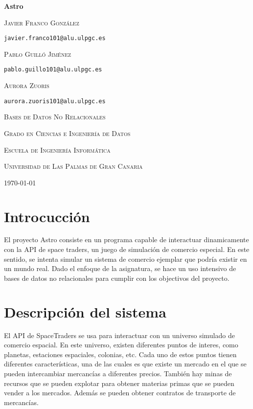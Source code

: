 \documentclass[spanish]{article}
\begin{document}
\begin{titlepage}
	\centering
	{\huge\bfseries Astro \par}
	\vspace{2cm}
	{\scshape\Large Javier Franco González \par\tt{javier.franco101@alu.ulpgc.es}\par}
	\vspace{1cm}
	{\scshape\Large Pablo Guilló Jiménez \par\tt{pablo.guillo101@alu.ulpgc.es}\par}
	\vspace{1cm}
	{\scshape\Large Aurora Zuoris \par\tt{aurora.zuoris101@alu.ulpgc.es}\par}
	\vspace{3cm}
	{\scshape\large Bases de Datos No Relacionales \par}
	\vspace{1cm}
	{\scshape\large Grado en Ciencias e Ingeniería de Datos\par}
	\vspace{1cm}
	{\scshape\large Escuela de Ingeniería Informática\par}
	\vspace{1cm}
	{\scshape\large Universidad de Las Palmas de Gran Canaria\par}
	\vspace{1cm}
	{\scshape\large \today{} \par}
\end{titlepage}

\tableofcontents

\section{Introcucción}

El proyecto Astro consiste en un programa capable de interactuar dinamicamente con la API de space traders,
un juego de simulación de comercio especial. En este sentido, se intenta simular un sistema de comercio
ejemplar que podría existir en un mundo real.
Dado el enfoque de la asignatura, se hace un uso intensivo de bases de datos no relacionales para
cumplir con los objectivos del proyecto.

\section{Descripción del sistema}

El API de SpaceTraders se usa para interactuar con
un universo simulado de comercio espacial.
En este universo, existen diferentes puntos de interes,
como planetas, estaciones espaciales, colonias, etc.
Cada uno de estos puntos tienen diferentes características,
una de las cuales es que existe un mercado en el que se pueden
intercambiar mercancías a diferentes precios.
También hay minas de recursos que se pueden explotar para
obtener materias primas que se pueden vender a los mercados.
Además se pueden obtener contratos de transporte de mercancías.
\end{document}
